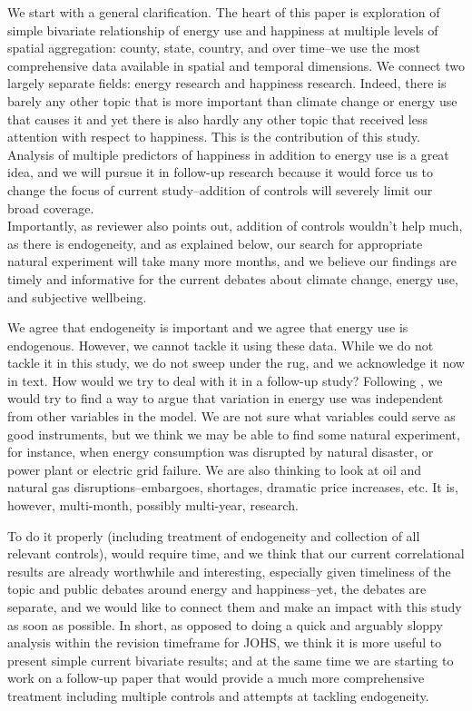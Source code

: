 We start with a general clarification.
The heart of this paper is exploration of simple bivariate relationship of
energy use and happiness at multiple levels of spatial aggregation: county,
state, country, and over time--we use the most comprehensive data available in
spatial and temporal dimensions.
We connect two largely separate fields: energy
research and happiness research. Indeed, there is barely any other topic that is
more important than climate change or energy use that causes it and yet there is
also hardly any other topic that received less attention with respect to
happiness. This is the contribution of this study.
\\

Analysis of multiple predictors of happiness in addition to energy use is a
great idea, and we will pursue it in follow-up research because it would
 force us to change the focus of current study--addition of controls will
 severely limit our broad coverage.
\\

Importantly, as reviewer also points out, addition of controls
wouldn't help much, as there is endogeneity, and as explained below, our search
for appropriate natural experiment will take many more months, and we believe
our findings are timely and informative for the current debates about climate
change, energy use, and subjective wellbeing.



We agree that endogeneity is important and we agree that energy use is
endogenous. However, we cannot tackle it using these data. While we do not
tackle it in this study, we do not sweep under the rug, and we acknowledge it
now in text.  How would we try to deal with it in a follow-up study?
 Following \citep{sorensen12}, we would
 try to find a way to argue that variation in energy use was independent from
 other variables in the model. We are not sure what variables could serve as
 good 
 instruments, but we think we may be able to find some natural experiment, for
 instance, when energy consumption was disrupted by natural disaster, or power
 plant or electric grid failure. We are also thinking to look at oil and natural gas disruptions--embargoes, shortages, dramatic price increases, etc. It is,  however, multi-month, possibly multi-year, research. 

To do it properly (including treatment of endogeneity and collection of all
relevant controls), would require
time, and we think that our current correlational results are already worthwhile
and interesting, especially given timeliness of the topic and public debates
around energy and happiness--yet, the debates are separate, and we would like to
 connect them and make an impact with this study as soon as possible. In short, as opposed to
doing a quick and arguably sloppy analysis within the revision timeframe for
JOHS, we think it is more useful to present simple current
bivariate results; and at the same time we are starting to work on a follow-up
paper that would provide a much more comprehensive treatment including multiple
controls and attempts at tackling endogeneity.\\ 

